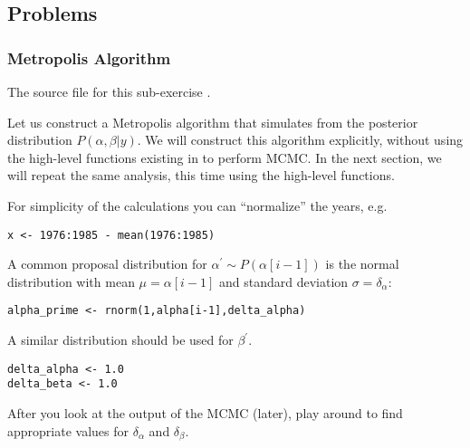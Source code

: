 \subsection{Problems}

\subsubsection{Metropolis Algorithm}%

The source file for this sub-exercise .

Let us construct a Metropolis algorithm that simulates from the posterior distribution $P(\alpha,\beta|y)$. 
We will construct this algorithm explicitly, without using the high-level functions existing in \RevBayes  to perform MCMC. 
In the next section, we will repeat the same analysis, this time using the high-level functions.
 
For simplicity of the calculations you can ``normalize'' the years, e.g. 
{\tt \begin{snugshade*}
\begin{lstlisting}    
x <- 1976:1985 - mean(1976:1985)
\end{lstlisting}
\end{snugshade*}}

A common proposal distribution for $\alpha^{\prime} \sim P(\alpha[i-1])$ is the normal distribution with mean $\mu = \alpha[i-1]$ and standard deviation $\sigma = \delta_\alpha$:

{\tt \begin{snugshade*}
\begin{lstlisting}    
alpha_prime <- rnorm(1,alpha[i-1],delta_alpha)
\end{lstlisting}
\end{snugshade*}}
A similar distribution should be used for $\beta^{\prime}$. 
{\tt \begin{snugshade*}
\begin{lstlisting}    
delta_alpha <- 1.0
delta_beta <- 1.0
\end{lstlisting}
\end{snugshade*}}
After you look at the output of the MCMC (later), play around to find appropriate values for $\delta_{\alpha}$ and $\delta_{\beta}$.

